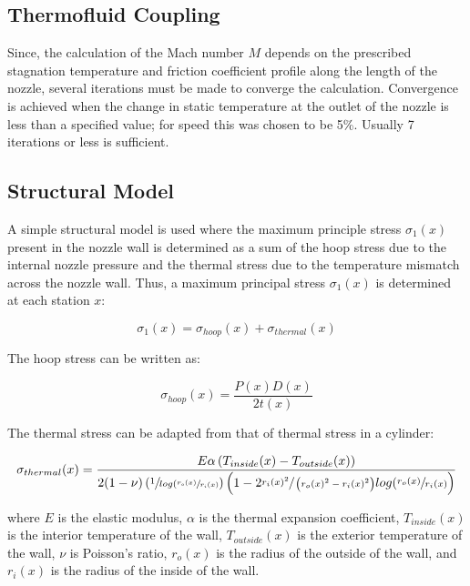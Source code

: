 \documentclass{article}
\begin{document}
\subsection{Thermofluid Coupling}

Since, the calculation of the Mach number $M$ depends on the prescribed stagnation temperature and friction coefficient profile along the length of the nozzle, several iterations must be made to converge the calculation. Convergence is achieved when the change in static temperature at the outlet of the nozzle is less than a specified value; for speed this was chosen to be 5\%. Usually 7 iterations or less is sufficient.

\subsection{Structural Model}

A simple structural model is used where the maximum principle stress $\sigma_1(x)$ present in the nozzle wall is determined as a sum of the hoop stress due to the internal nozzle pressure and the thermal stress due to the temperature mismatch across the nozzle wall. Thus, a maximum principal stress $\sigma_1(x)$ is determined at each station $x$:

\begin{equation}
\sigma_1(x) = \sigma_{hoop}(x) + \sigma_{thermal}(x)
\end{equation}

The hoop stress can be written as:

\begin{equation}
\sigma_{hoop} (x) = \frac{P(x) D(x)}{2 t(x)}
\end{equation}

The thermal stress can be adapted from that of thermal stress in a cylinder:

\begin{equation}
  \sigma_{thermal} (x) = \frac{E \alpha \left(T_{inside}(x) - T_{outside}(x)\right)}{2 (1 - \nu) \left( \sfrac{1}{log(\sfrac{r_o(x)}{r_i(x)}} \right) \left( 1 - 2 \sfrac{r_i(x)^2}{\left(r_o(x)^2 - r_i(x)^2\right)} log(\sfrac{r_o(x)}{r_i(x)} \right) }
\end{equation}

where $E$ is the elastic modulus, $\alpha$ is the thermal expansion coefficient, $T_{inside}(x)$ is the interior temperature of the wall, $T_{outside}(x)$ is the exterior temperature of the wall, $\nu$ is Poisson's ratio, $r_o(x)$ is the radius of the outside of the wall, and $r_i(x)$ is the radius of the inside of the wall.
\end{document}
